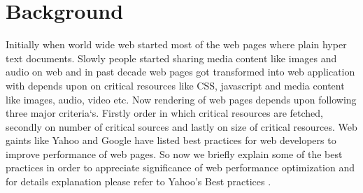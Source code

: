\documentclass[conference]{IEEEtran}
\begin{document}
\section{Background}\label{sec-3}
Initially when world wide web started most of the web pages where plain hyper text documents.
Slowly people started sharing media content like images and audio on web and in past decade
web pages got transformed into web application with depends upon on critical resources
like CSS, javascript and media content like images, audio, video etc. Now rendering of web pages depends upon
following three major criteria`s. Firstly order in which critical resources are fetched, secondly on
number of critical sources and lastly on size of critical resources. Web gaints like Yahoo and Google
have listed best practices for web developers to improve performance of web pages. So now we briefly
explain some of the best practices in order to appreciate significance of web performance optimization 
and for details explanation please refer to Yahoo's Best practices \cite{best-practices}.
\end{document}
